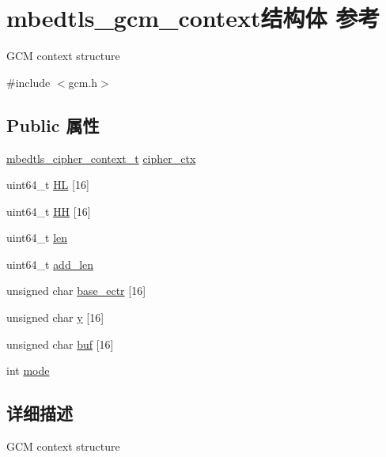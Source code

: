 \hypertarget{structmbedtls__gcm__context}{}\section{mbedtls\+\_\+gcm\+\_\+context结构体 参考}
\label{structmbedtls__gcm__context}


G\+CM context structure  




{\ttfamily \#include $<$gcm.\+h$>$}

\subsection*{Public 属性}
\begin{DoxyCompactItemize}
\item 
\hyperlink{structmbedtls__cipher__context__t}{mbedtls\+\_\+cipher\+\_\+context\+\_\+t} \hyperlink{structmbedtls__gcm__context_a3687a336bb05c025fb3861ca99cd945d}{cipher\+\_\+ctx}
\item 
uint64\+\_\+t \hyperlink{structmbedtls__gcm__context_af5731ab9002f0b1b913e66071e1138fc}{HL} \mbox{[}16\mbox{]}
\item 
uint64\+\_\+t \hyperlink{structmbedtls__gcm__context_a5935337c8028cc6fec0c5b9c7d0d4fd8}{HH} \mbox{[}16\mbox{]}
\item 
uint64\+\_\+t \hyperlink{structmbedtls__gcm__context_a7ca348b10a75f1ab46f7c5067c1ab6e7}{len}
\item 
uint64\+\_\+t \hyperlink{structmbedtls__gcm__context_aabc65285117dd4b35998a328648faa20}{add\+\_\+len}
\item 
unsigned char \hyperlink{structmbedtls__gcm__context_a0ad9a8fb116959218c800b0bc3caeaba}{base\+\_\+ectr} \mbox{[}16\mbox{]}
\item 
unsigned char \hyperlink{structmbedtls__gcm__context_a1a7eb48ed5911aeb2dd983da6cfd32bb}{y} \mbox{[}16\mbox{]}
\item 
unsigned char \hyperlink{structmbedtls__gcm__context_a772f2b1c947e9a3631f55b241c421aca}{buf} \mbox{[}16\mbox{]}
\item 
int \hyperlink{structmbedtls__gcm__context_a48f2fbbac9f7bb46411fea24ac433628}{mode}
\end{DoxyCompactItemize}


\subsection{详细描述}
G\+CM context structure 


